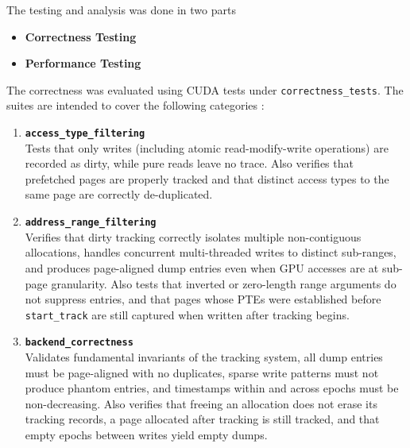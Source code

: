 
The testing and analysis was done in two parts
\begin{itemize}
    \item \textbf{Correctness Testing}
    \item \textbf{Performance Testing}
\end{itemize}

The correctness was evaluated using CUDA tests under \texttt{correctness\_tests}.
The suites are intended to cover the following categories :
\begin{enumerate}

    \item \textbf{\texttt{access\_type\_filtering}}
          \\Tests that only writes (including atomic read-modify-write operations) are
          recorded as dirty, while pure reads leave no trace.
          Also verifies that prefetched pages are properly tracked and that distinct
          access types to the same page are correctly de-duplicated.\\

    \item \textbf{\texttt{address\_range\_filtering}}
          \\Verifies that dirty tracking correctly isolates multiple non-contiguous
          allocations, handles concurrent multi-threaded writes to distinct sub-ranges,
          and produces page-aligned dump entries even when GPU accesses are at
          sub-page granularity.
          Also tests that inverted or zero-length range arguments do not suppress
          entries, and that pages whose PTEs were established before \texttt{start\_track}
          are still captured when written after tracking begins.\\

    \item \textbf{\texttt{backend\_correctness}}
          \\Validates fundamental invariants of the tracking system,
          all dump entries must be page-aligned with no duplicates, sparse write
          patterns must not produce phantom entries, and timestamps within and across
          epochs must be non-decreasing.
          Also verifies that freeing an allocation does not erase its tracking records,
          a page allocated after tracking is still tracked, 
          and that empty epochs between writes yield empty dumps.\\


\end{enumerate}
